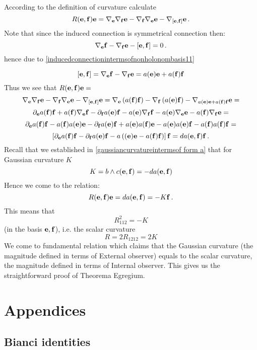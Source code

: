 \documentclass[12pt]{article}
\theoremstyle{theorem}
\numberwithin{equation}{section}
\begin{document}
 According to the definition of curvature calculate
         $$
 R({\bf e},{\bf f}){\bf e}=\nabla_{{\bf e}}\nabla_{{\bf f}}{\bf e}-\nabla_{{\bf f}}\nabla_{{\bf e}}{\bf e}-\nabla_{[{\bf e},{\bf f}]}{\bf e}\,.
         $$
Note that since the induced connection is symmetrical connection then:
        \begin{equation}\label{commutatorofnonholonombasis}
 \nabla_{\bf e} {\bf f}-\nabla_{\bf f} {\bf e}- [{\bf e},{\bf f}]=0\,.
\end{equation}
hence due to \eqref{inducedconnectionintermsofnonholonombasis11}

       \begin{equation}\label{commutatorofnonholonombasis}
 [{\bf e},{\bf f}]=\nabla_{\bf e} {\bf f}-\nabla_{\bf f} {\bf e}=a({\bf e}){\bf e}+a({\bf f}){\bf f}
\end{equation}
Thus we see that  $R({\bf e},{\bf f}){\bf e}=$
       $$
 \nabla_{{\bf e}}\nabla_{{\bf f}}{\bf e}-\nabla_{{\bf f}}\nabla_{{\bf e}}{\bf e}-\nabla_{[{\bf e},{\bf f}]}{\bf e}=
       \nabla_{\bf e}\left(a({\bf f}){\bf f}\right)-\nabla_{\bf f}\left(a({\bf e}){\bf f}\right)-\nabla_{a({\bf e}){\bf e}+a({\bf f}){\bf f}}{\bf e}=
       $$
       $$
  \partial_{{\bf e}}a({\bf f}){\bf f}+a({\bf f})\nabla_{\bf e}{\bf f}-\partial_{{\bf f}}a({\bf e}){\bf f}-a({\bf e})\nabla_{\bf f}{\bf f}-a({\bf e})\nabla_{\bf e}{\bf e}-a({\bf f})\nabla_{\bf f}{\bf e}=
       $$
       $$
  \partial_{{\bf e}}a({\bf f}){\bf f}-a({\bf f})a({\bf e}){\bf e}-\partial_{{\bf f}}a({\bf e}){\bf f}+a({\bf e})a({\bf f}){\bf e}-a({\bf e})a({\bf e}){\bf f}-a({\bf f})a({\bf f}){\bf f}=
       $$
       $$
       \left[\partial_{{\bf e}}a({\bf f}){\bf f}-\partial_{{\bf f}}a({\bf e}){\bf f}-a\left(({\bf e}){\bf e}-a({\bf f}){\bf f}\right)\right]{\bf f}=
       da({\bf e},{\bf f}){\bf f}\,.
       $$
  Recall that we established in \ref{gaussiancurvatureintermsof form a} that for Gaussian curvature $K$
          $$
       K=b\wedge c({\bf e},{\bf f})=-da({\bf e},{\bf f})
          $$
       Hence we come to the relation:
       \begin{equation}\label{relationbetweengausscurvatureand riemtensor}
        R({\bf e},{\bf f}){\bf e}=da({\bf e},{\bf f})=-K{\bf f}\,.
       \end{equation}
       This means that
       $$
         R^2_{112}=-K
       $$
(in the basis ${{\bf e},{\bf f}}$), i.e.
 the scalar curvature
   $$
R=2R_{1212}=2K
   $$
 We come to fundamental relation which claims that the Gaussian curvature  (the magnitude defined in terms of
 External observer) equals to the scalar curvature, the magnitude defined in terms of Internal observer.
   This gives us the straightforward proof of Theorema Egregium.





\section {Appendices}


 \subsection {Bianci identities}
\end{document}
